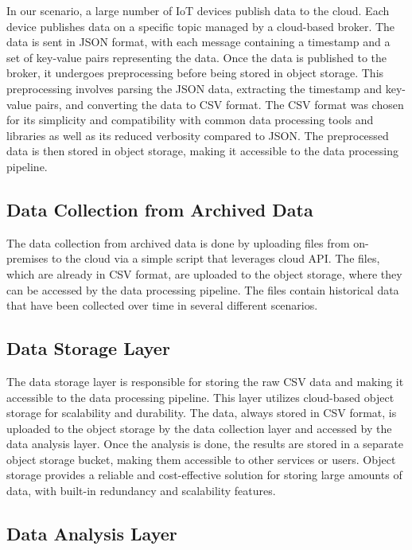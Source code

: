 In our scenario, a large number of IoT devices publish data to the cloud. Each device publishes data on a specific topic managed by a cloud-based broker. The data is sent in JSON format, with each message containing a timestamp and a set of key-value pairs representing the data. Once the data is published to the broker, it undergoes preprocessing before being stored in object storage. This preprocessing involves parsing the JSON data, extracting the timestamp and key-value pairs, and converting the data to CSV format. The CSV format was chosen for its simplicity and compatibility with common data processing tools and libraries as well as its reduced verbosity compared to JSON. The preprocessed data is then stored in object storage, making it accessible to the data processing pipeline.


\subsection{Data Collection from Archived Data}
The data collection from archived data is done by uploading files from on-premises to the cloud via a simple script that leverages cloud API. The files, which are already in CSV format, are uploaded to the object storage, where they can be accessed by the data processing pipeline. The files contain historical data that have been collected over time in several different scenarios.

\subsection{Data Storage Layer}

The data storage layer is responsible for storing the raw CSV data and making it accessible to the data processing pipeline. This layer utilizes cloud-based object storage for scalability and durability. The data, always stored in CSV format, is uploaded to the object storage by the data collection layer and accessed by the data analysis layer.
Once the analysis is done, the results are stored in a separate object storage bucket, making them accessible to other services or users.
Object storage provides a reliable and cost-effective solution for storing large amounts of data, with built-in redundancy and scalability features.

\subsection{Data Analysis Layer}

